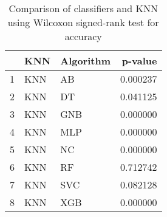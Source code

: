 \begin{table}
\footnotesize
\caption{Comparison of classifiers and KNN using Wilcoxon signed-rank test for accuracy}
\label{tab:KNN wilcoxon ACC comparison}
\begin{tabular}{lllr}
\hline
 & KNN & Algorithm & p-value \\
\hline
1 & KNN & AB & 0.000237 \\
2 & KNN & DT & 0.041125 \\
3 & KNN & GNB & 0.000000 \\
4 & KNN & MLP & 0.000000 \\
5 & KNN & NC & 0.000000 \\
6 & KNN & RF & 0.712742 \\
7 & KNN & SVC & 0.082128 \\
8 & KNN & XGB & 0.000000 \\
\hline
\end{tabular}
\end{table}
